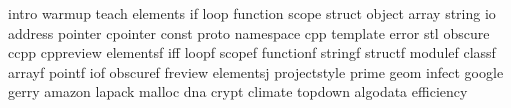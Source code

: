 intro
warmup
teach
elements
if
loop
function
scope
struct
object
array
string
io
address
pointer
cpointer
const
proto
namespace
cpp
template
error
stl
obscure
ccpp
cppreview
elementsf
iff
loopf
scopef
functionf
stringf
structf
modulef
classf
arrayf
pointf
iof
obscuref
freview
elementsj
projectstyle
prime
geom
infect
google
gerry
amazon
lapack
malloc
dna
crypt
climate
topdown
algodata
efficiency
